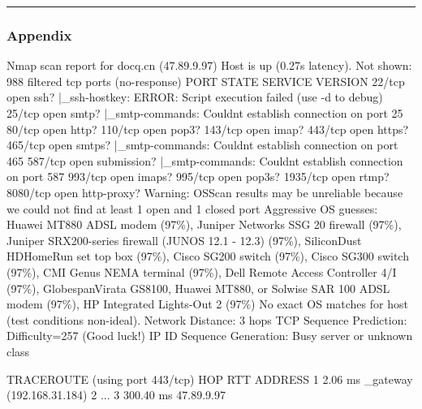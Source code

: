 \documentclass[
]{article}
\newenvironment{Shaded}{}{}
\newcommand{\NormalTok}[1]{#1}
\begin{document}
\begin{center}\rule{0.5\linewidth}{0.5pt}\end{center}

\subsubsection{Appendix}\label{appendix-2}

\begin{Shaded}
\begin{Highlighting}[]
\NormalTok{Nmap scan report for docq.cn (47.89.9.97)}
\NormalTok{Host is up (0.27s latency).}
\NormalTok{Not shown: 988 filtered tcp ports (no{-}response)}
\NormalTok{PORT     STATE SERVICE     VERSION}
\NormalTok{22/tcp   open  ssh?}
\NormalTok{|\_ssh{-}hostkey: ERROR: Script execution failed (use {-}d to debug)}
\NormalTok{25/tcp   open  smtp?}
\NormalTok{|\_smtp{-}commands: Couldn\textquotesingle{}t establish connection on port 25}
\NormalTok{80/tcp   open  http?}
\NormalTok{110/tcp  open  pop3?}
\NormalTok{143/tcp  open  imap?}
\NormalTok{443/tcp  open  https?}
\NormalTok{465/tcp  open  smtps?}
\NormalTok{|\_smtp{-}commands: Couldn\textquotesingle{}t establish connection on port 465}
\NormalTok{587/tcp  open  submission?}
\NormalTok{|\_smtp{-}commands: Couldn\textquotesingle{}t establish connection on port 587}
\NormalTok{993/tcp  open  imaps?}
\NormalTok{995/tcp  open  pop3s?}
\NormalTok{1935/tcp open  rtmp?}
\NormalTok{8080/tcp open  http{-}proxy?}
\NormalTok{Warning: OSScan results may be unreliable because we could not find at least 1 open and 1 closed port}
\NormalTok{Aggressive OS guesses: Huawei MT880 ADSL modem (97\%), Juniper Networks SSG 20 firewall (97\%), Juniper SRX200{-}series firewall (JUNOS 12.1 {-} 12.3) (97\%), SiliconDust HDHomeRun set top box (97\%), Cisco SG200 switch (97\%), Cisco SG300 switch (97\%), CMI Genus NEMA terminal (97\%), Dell Remote Access Controller 4/I (97\%), GlobespanVirata GS8100, Huawei MT880, or Solwise SAR 100 ADSL modem (97\%), HP Integrated Lights{-}Out 2 (97\%)}
\NormalTok{No exact OS matches for host (test conditions non{-}ideal).}
\NormalTok{Network Distance: 3 hops}
\NormalTok{TCP Sequence Prediction: Difficulty=257 (Good luck!)}
\NormalTok{IP ID Sequence Generation: Busy server or unknown class}

\NormalTok{TRACEROUTE (using port 443/tcp)}
\NormalTok{HOP RTT       ADDRESS}
\NormalTok{1   2.06 ms   \_gateway (192.168.31.184)}
\NormalTok{2   ...}
\NormalTok{3   300.40 ms 47.89.9.97}


\end{Highlighting}
\end{Shaded}
\end{document}

